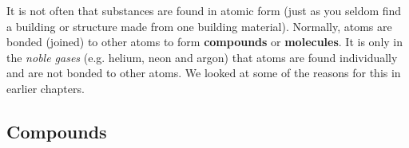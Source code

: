  \label{m38120*id307459}It is not often that substances are found in atomic form (just as you seldom find a building or structure made from one building material). Normally, atoms are bonded (joined) to other atoms to form \textbf{compounds} or \textbf{molecules}. It is only in the \textsl{noble gases} (e.g. helium, neon and argon) that atoms are found individually and are not bonded to other atoms. We looked at some of the  reasons for this in earlier chapters.
    \subsection*{Compounds}
            \nopagebreak

